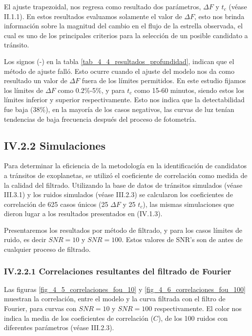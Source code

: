 El ajuste trapezoidal, nos regresa como resultado dos parámetros, $\Delta F$ y $t_{c}$ (véase II.1.1). En estos resultados evaluamos solamente el valor de $\Delta F$, esto nos brinda información sobre la magnitud del cambio en el flujo de la estrella observada, el cual es uno de los principales criterios para la selección de un posible candidato a tránsito. 

Los signos (-) en la tabla \ref{tab_4_4_resultados_profundidad}, indican que el método de ajuste falló. Esto ocurre cuando el ajuste del modelo nos da como resultado un valor de $\Delta F$ fuera de los límites permitidos. En este estudio fijamos los límites de $\Delta F$ como 0.2\%-5\%, y para $t_{c}$ como 15-60 minutos, siendo estos los límites inferior y superior respectivamente. Esto nos indica que la detectabilidad fue baja (38\%), en la mayoría de los casos negativos, las curvas de luz tenían tendencias de baja frecuencia después del proceso de fotometría.

\subsection*{IV.2.2 Simulaciones}

Para determinar la eficiencia de la metodología en la identificación de candidatos a tránsitos de exoplanetas, se utilizó el coeficiente de correlación como medida de la calidad del filtrado. Utilizando la base de datos de tránsitos simulados (véase III.3.1) y los ruidos simulados (véase III.2.3) se calcularon los coeficientes de correlación de 625 casos únicos (25 $\Delta F$ y 25 $t_{c}$), las mismas simulaciones que dieron lugar a los resultados presentados en (IV.1.3).

Presentaremos los resultados por método de filtrado, y para los casos límites de ruido, es decir $SNR=10$ y $SNR=100$. Estos valores de SNR's son de antes de cualquier proceso de filtrado.

\subsubsection*{IV.2.2.1 Correlaciones resultantes del filtrado de Fourier}

Las figuras \ref{fig_4_5_correlaciones_fou_10} y \ref{fig_4_6_correlaciones_fou_100} muestran la correlación, entre el modelo y la curva filtrada con el filtro de Fourier, para curvas con $SNR=10$ y $SNR=100$ respectivamente. El color nos indica la media de los coeficientes de correlación ($C$), de los 100 ruidos con diferentes parámetros (véase III.2.3).

